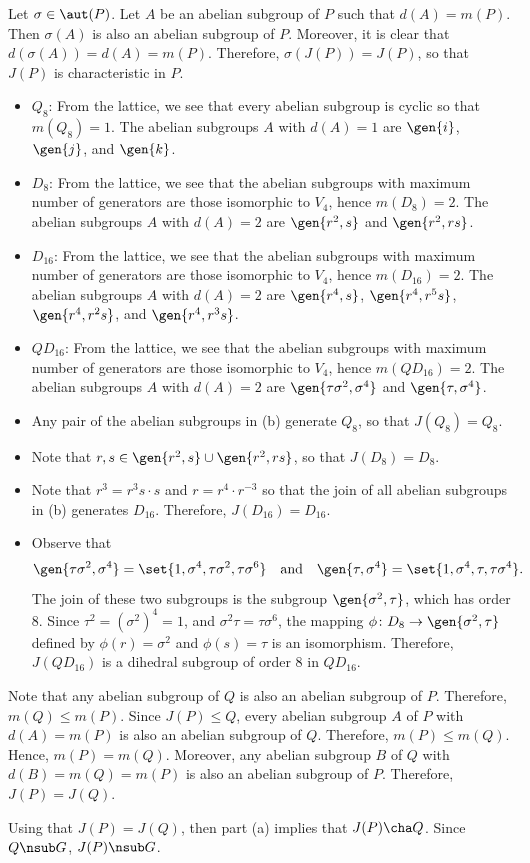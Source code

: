\begin{solenum}
	\item Let $\sigma \in \aut(P)$.
	Let $A$ be an abelian subgroup of $P$ such that $d(A) = m(P)$.
	Then $\sigma(A)$ is also an abelian subgroup of $P$.
	Moreover, it is clear that $d(\sigma(A)) = d(A) = m(P)$.
	Therefore, $\sigma(J(P)) = J(P)$, so that $J(P)$ is characteristic in $P$.
	\item 
	\begin{itemize}
		\item $Q_8$: From the lattice, we see that every abelian subgroup is cyclic so that $m(Q_8) = 1$.
	The abelian subgroups $A$ with $d(A) = 1$ are $\gen{i}$, $\gen{j}$, and $\gen{k}$.
		\item $D_8$: From the lattice, we see that the abelian subgroups with maximum number of generators are those isomorphic to $V_4$, hence $m(D_8) = 2$.
	The abelian subgroups $A$ with $d(A) = 2$ are $\gen{r^2, s}$ and $\gen{r^2, rs}$.
		\item $D_{16}$: From the lattice, we see that the abelian subgroups with maximum number of generators are those isomorphic to $V_4$, hence $m(D_{16}) = 2$.
	The abelian subgroups $A$ with $d(A) = 2$ are $\gen{r^4, s}$, $\gen{r^4, r^5s}$, $\gen{r^4, r^2s}$, and $\gen{r^4, r^3s}$.
		\item $QD_{16}$: From the lattice, we see that the abelian subgroups with maximum number of generators are those isomorphic to $V_4$, hence $m(QD_{16}) = 2$.
	The abelian subgroups $A$ with $d(A) = 2$ are $\gen{\tau\sigma^2, \sigma^4}$ and $\gen{\tau, \sigma^4}$.
	\end{itemize}
	\item 
	\begin{itemize}
		\item Any pair of the abelian subgroups in (b) generate $Q_8$, so that $J(Q_8) = Q_8$.
		\item Note that $r, s \in \gen{r^2, s} \cup \gen{r^2, rs}$, so that $J(D_8) = D_8$.
		\item Note that $r^3 = r^3s \cdot s$ and $r = r^4 \cdot r^{-3}$ so that the join of all abelian subgroups in (b) generates $D_{16}$.
	Therefore, $J(D_{16}) = D_{16}$.
		\item Observe that
		\[
			\gen{\tau\sigma^2, \sigma^4} = \set{1, \sigma^4, \tau\sigma^2, \tau\sigma^6} \quad \text{and} \quad \gen{\tau, \sigma^4} = \set{1, \sigma^4, \tau, \tau\sigma^4}.
		\]
		The join of these two subgroups is the subgroup $\gen{\sigma^2, \tau}$, which has order 8.
	Since $\tau^2 = (\sigma^2)^4 = 1$, and $\sigma^2\tau = \tau\sigma^6$, the mapping $\phi \colon D_8 \to \gen{\sigma^2, \tau}$ defined by $\phi(r) = \sigma^2$ and $\phi(s) = \tau$ is an isomorphism.
	Therefore, $J(QD_{16})$ is a dihedral subgroup of order 8 in $QD_{16}$.
	\end{itemize}
	\item Note that any abelian subgroup of $Q$ is also an abelian subgroup of $P$.
	Therefore, $m(Q) \leq m(P)$.
	Since $J(P) \leq Q$, every abelian subgroup $A$ of $P$ with $d(A) = m(P)$ is also an abelian subgroup of $Q$.
	Therefore, $m(P) \leq m(Q)$.
	Hence, $m(P) = m(Q)$.
	Moreover, any abelian subgroup $B$ of $Q$ with $d(B) = m(Q) = m(P)$ is also an abelian subgroup of $P$.
	Therefore, $J(P) = J(Q)$.
	
	Using that $J(P) = J(Q)$, then part (a) implies that $J(P) \cha Q$.
	Since $Q \nsub G$, $J(P) \nsub G$.
\end{solenum}